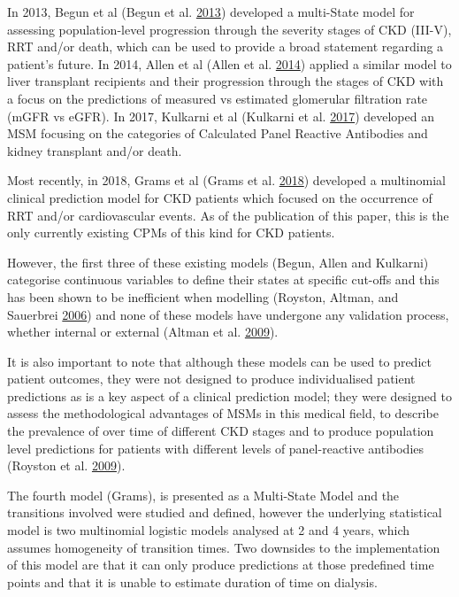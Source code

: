\documentclass[
]{article}
\begin{document}
In 2013, Begun et al (Begun et al. \protect\hyperlink{ref-begun_identification_2013}{2013}) developed a multi-State model for assessing population-level progression through the severity stages of CKD (III-V), RRT and/or death, which can be used to provide a broad statement regarding a patient's future. In 2014, Allen et al (Allen et al. \protect\hyperlink{ref-allen_chronic_2014}{2014}) applied a similar model to liver transplant recipients and their progression through the stages of CKD with a focus on the predictions of measured vs estimated glomerular filtration rate (mGFR vs eGFR). In 2017, Kulkarni et al (Kulkarni et al. \protect\hyperlink{ref-kulkarni_transition_2017}{2017}) developed an MSM focusing on the categories of Calculated Panel Reactive Antibodies and kidney transplant and/or death.

Most recently, in 2018, Grams et al (Grams et al. \protect\hyperlink{ref-grams_predicting_2018}{2018}) developed a multinomial clinical prediction model for CKD patients which focused on the occurrence of RRT and/or cardiovascular events. As of the publication of this paper, this is the only currently existing CPMs of this kind for CKD patients.

However, the first three of these existing models (Begun, Allen and Kulkarni) categorise continuous variables to define their states at specific cut-offs and this has been shown to be inefficient when modelling (Royston, Altman, and Sauerbrei \protect\hyperlink{ref-royston_dichotomizing_2006}{2006}) and none of these models have undergone any validation process, whether internal or external (Altman et al. \protect\hyperlink{ref-altman_prognosis_2009}{2009}).

It is also important to note that although these models can be used to predict patient outcomes, they were not designed to produce individualised patient predictions as is a key aspect of a clinical prediction model; they were designed to assess the methodological advantages of MSMs in this medical field, to describe the prevalence of over time of different CKD stages and to produce population level predictions for patients with different levels of panel-reactive antibodies (Royston et al. \protect\hyperlink{ref-royston_prognosis_2009}{2009}).

The fourth model (Grams), is presented as a Multi-State Model and the transitions involved were studied and defined, however the underlying statistical model is two multinomial logistic models analysed at 2 and 4 years, which assumes homogeneity of transition times. Two downsides to the implementation of this model are that it can only produce predictions at those predefined time points and that it is unable to estimate duration of time on dialysis.
\end{document}
